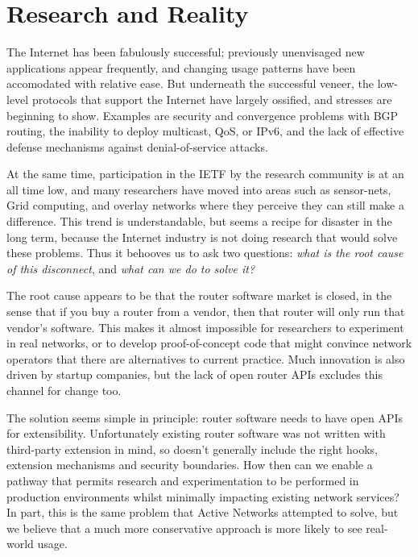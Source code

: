 
\section{Research and Reality}

The Internet has been fabulously successful; previously unenvisaged
new applications appear frequently, and changing usage patterns have
been accomodated with relative ease.  But underneath the successful
veneer, the low-level protocols that support the Internet have largely
ossified, and stresses are beginning to show.  Examples are security
and convergence problems with BGP routing, the inability to deploy
multicast, QoS, or IPv6, and the lack of effective defense mechanisms
against denial-of-service attacks.

At the same time, participation in the IETF by the research
community is at an all time low, and many researchers
have moved into areas such
as sensor-nets, Grid computing, and overlay networks where they
perceive they can still make a difference.  This trend is
understandable, but seems a recipe for disaster in the long term,
because the Internet industry is not doing research that would
solve these problems. Thus it behooves us to ask two questions: {\it
what is the root cause of this disconnect}, and {\it what can we do to
solve it?}

The root cause appears to be that the router software market is
closed, in the sense that if you buy a router from a vendor, then that
router will only run that vendor's software.  This makes it almost
impossible for researchers to experiment in real networks, or to
develop proof-of-concept code that might convince network operators
that there are alternatives to current practice.  Much innovation is
also driven by startup companies, but the lack of open router APIs
excludes this channel for change too.

The solution seems simple in principle: router software needs to have
open APIs for extensibility.  Unfortunately existing router software
was not written with third-party extension in mind, so doesn't
generally include the right hooks, extension mechanisms and security
boundaries.  
How then can we enable a pathway that permits research and
experimentation to be performed in production environments whilst
minimally impacting existing network services?  In part, this
is the same problem that Active Networks attempted to solve, but we
believe that a much more conservative approach is more likely to see
real-world usage.

